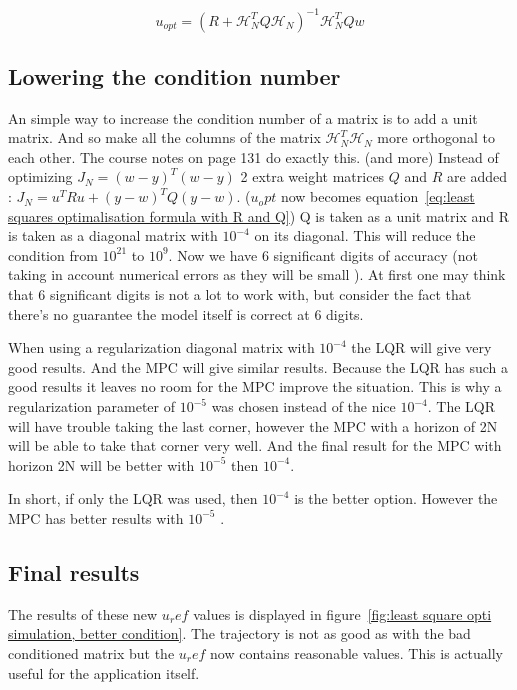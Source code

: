 \begin{equation}
u_{opt}=(R+\mathcal{H}_N^TQ\mathcal{H}_N)^{-1}\mathcal{H}_N^TQw
\label{eq:least squares optimalisation formula with R and Q}
\end{equation}

\subsection{Lowering the condition number}

An simple way to increase the condition number of a matrix is to add a unit matrix. And so make all the columns of the matrix $\mathcal{H}_N^T\mathcal{H}_N$ more orthogonal to each other. The course notes on page 131 do exactly this. (and more)
Instead of optimizing  $J_N = (w-y)^T(w-y)$ 2 extra weight matrices $Q$ and $R$ are added : $J_N = u^TRu + (y-w)^TQ(y-w)$. ($u_opt$ now becomes equation~\ref{eq:least squares optimalisation formula with R and Q}) Q is taken as a unit matrix and R is taken as a diagonal matrix with $10^{-4}$ on its diagonal. This will reduce the condition from $10^{21}$ to  $10^{9}$. Now we have 6 significant digits of  accuracy (not taking in account numerical errors as they will be small ). At first one may think that 6 significant digits is not a lot to work with, but consider the fact that there's no guarantee the model itself is correct at 6 digits.

When using a regularization diagonal matrix with $10^{-4}$ the LQR will give very good results. And the MPC will give similar results. Because the LQR has such a good results it leaves no room for the MPC improve the situation. This is why a regularization parameter of $10^{-5}$ was chosen instead of the nice $10^{-4}$. The LQR will have trouble taking the last corner, however the MPC with a horizon of 2N will be able to take that corner very well. And the final result for the MPC with horizon 2N will be better with $10^{-5}$ then  $10^{-4}$.

In short, if only the LQR was used, then $10^{-4}$ is the better option. However the MPC has better results with $10^{-5}$ .

\subsection{Final results}

The results of these new $u_ref$ values is displayed in figure~\ref{fig:least square opti simulation, better condition}. The trajectory is not as good as with the bad conditioned matrix but the $u_ref$ now contains reasonable values. This is actually useful for the application itself.

